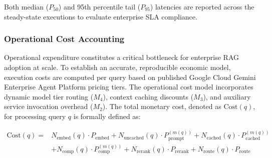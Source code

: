 Both median ($P_{50}$) and 95th percentile tail ($P_{95}$) latencies are reported across the steady-state executions to evaluate enterprise SLA compliance.


\subsubsection{Operational Cost Accounting}
\label{sec:costs}

Operational expenditure constitutes a critical bottleneck for enterprise RAG adoption at scale. To establish an accurate, reproducible economic model, execution costs are computed per query based on published Google Cloud Gemini Enterprise Agent Platform pricing tiers. The operational cost model incorporates dynamic model tier routing ($M_4$), context caching discounts ($M_3$), and auxiliary service invocation overhead ($M_2$). The total monetary cost, denoted as $\text{Cost}(q)$, for processing query $q$ is formally defined as:

\begin{equation}
\label{eq:costs}
\begin{split}
\text{Cost}(q) ={} & N_{\text{embed}}(q) \cdot P_{\text{embed}} + N_{\text{uncached}}(q) \cdot P_{\text{prompt}}^{(m(q))} + N_{\text{cached}}(q) \cdot P_{\text{cached}}^{(m(q))} \\
& + N_{\text{comp}}(q) \cdot P_{\text{comp}}^{(m(q))} + N_{\text{rerank}}(q) \cdot P_{\text{rerank}} + N_{\text{route}}(q) \cdot P_{\text{route}}
\end{split}
\end{equation}


